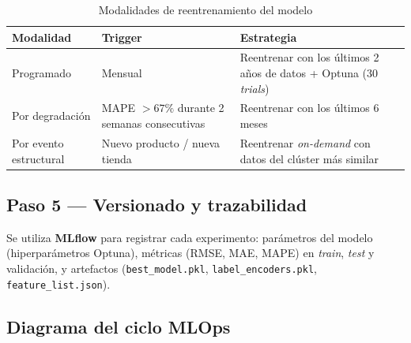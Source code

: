 \documentclass[12pt, a4paper, oneside]{report}
\newcommand{\code}[1]{\texttt{\small\color{codeblue}#1}}
\begin{document}
\begin{table}[H]
  \centering
  \caption{Modalidades de reentrenamiento del modelo}
  \label{tab:reentrenamiento}
  \begin{tabularx}{\textwidth}{L{2.8cm} L{4.5cm} X}
    \toprule
    {\color{white}\textbf{Modalidad}} &
    {\color{white}\textbf{Trigger}} &
    {\color{white}\textbf{Estrategia}} \\
    \midrule
    Programado & Mensual &
    Reentrenar con los \'ultimos 2 a\~nos de datos + Optuna (30 \textit{trials}) \\
    Por degradaci\'on & MAPE $>67\%$ durante 2 semanas consecutivas &
    Reentrenar con los \'ultimos 6 meses \\
    Por evento estructural & Nuevo producto / nueva tienda &
    Reentrenar \textit{on-demand} con datos del cl\'uster m\'as similar \\
    \bottomrule
  \end{tabularx}
\end{table}

\subsection{Paso 5 --- Versionado y trazabilidad}

Se utiliza \textbf{MLflow} para registrar cada experimento: par\'ametros del modelo (hiperpar\'ametros Optuna), m\'etricas (RMSE, MAE, MAPE) en \textit{train}, \textit{test} y validaci\'on, y artefactos (\code{best\_model.pkl}, \code{label\_encoders.pkl}, \code{feature\_list.json}).

\subsection{Diagrama del ciclo MLOps}
\end{document}
